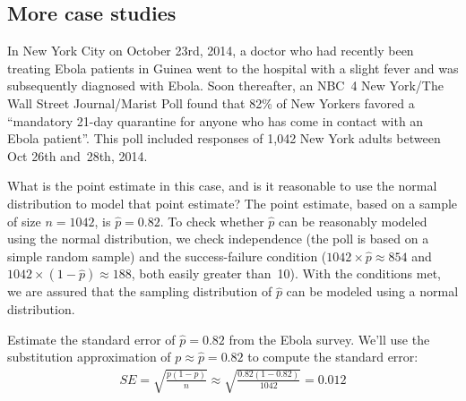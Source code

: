 \subsection{More case studies}


\newcommand{\wsjebolapollsize}{1042}
\newcommand{\wsjebolapollsizecomma}{1,042}
\newcommand{\wsjebolapollprop}{0.82}
\newcommand{\wsjebolapollpropcomplement}{0.18}
\newcommand{\wsjebolapollpercent}{82}
\newcommand{\wsjebolapollpercentcomplement}{18}
\newcommand{\wsjebolapollcount}{854}
\newcommand{\wsjebolapollcountcomplement}{188}
\newcommand{\wsjebolapollse}{0.012}


In New York City on October 23rd, 2014, a doctor who had recently been
treating Ebola patients in Guinea went to the hospital with a slight fever
and was subsequently diagnosed with Ebola. Soon thereafter,
an NBC~4 New York/The Wall Street Journal/Marist Poll found that
\wsjebolapollpercent{}\% of New Yorkers favored a ``mandatory 21-day
quarantine for anyone who has come in contact with an Ebola
patient''. This poll included responses
of \wsjebolapollsizecomma{} New York adults between
Oct 26th and~28th, 2014.

\begin{example}{What is the point estimate in this case,
    and is it reasonable to
    use the normal distribution to model that point estimate?}
  The point estimate, based on a sample of size $n = \wsjebolapollsize{}$,
  is $\hat{p} = \wsjebolapollprop{}$. To check whether $\hat{p}$ can be reasonably
  modeled using the normal distribution, we check independence
  (the poll is based on a simple random sample) and the
  success-failure condition
  ($\wsjebolapollsize{} \times \hat{p} \approx \wsjebolapollcount{}$
  and $\wsjebolapollsize{} \times (1 - \hat{p})
      \approx \wsjebolapollcountcomplement{}$,
  both easily greater than~10). With the conditions met, we are assured
  that the sampling distribution of $\hat{p}$ can be modeled using
  a normal distribution.
\end{example}

\begin{example}{Estimate the standard error of
    $\hat{p} = \wsjebolapollprop{}$ from the Ebola survey.}
  We'll use the substitution approximation of
  $p \approx \hat{p} = \wsjebolapollprop{}$ to compute the standard error:
  \begin{align*}
  SE = \sqrt{\frac{p(1-p)}{n}}
    \approx \sqrt{\frac{\wsjebolapollprop{}
        (1 - \wsjebolapollprop{})}{\wsjebolapollsize{}}}
    = \wsjebolapollse{}
  \end{align*}
\end{example}

